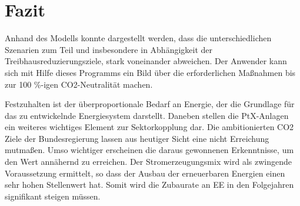 \section{Fazit}
Anhand des Modells konnte dargestellt werden, dass die unterschiedlichen Szenarien zum Teil und insbesondere in Abhängigkeit der Treibhausreduzierungsziele, stark voneinander abweichen. Der Anwender kann sich mit Hilfe dieses Programms ein Bild über die erforderlichen Maßnahmen bis zur 100 \%-igen CO2-Neutralität machen. 

Festzuhalten ist der überproportionale Bedarf an Energie, der die Grundlage für das zu entwickelnde Energiesystem darstellt. Daneben stellen die PtX-Anlagen ein weiteres wichtiges Element zur Sektorkopplung dar. 
\newline
Die ambitionierten CO2 Ziele der Bundesregierung lassen aus heutiger Sicht eine nicht Erreichung mutmaßen. Umso wichtiger erscheinen die daraus gewonnenen Erkenntnisse, um den Wert annähernd zu erreichen. Der Stromerzeugungsmix wird als zwingende Voraussetzung ermittelt, so dass der Ausbau der erneuerbaren Energien einen sehr hohen Stellenwert hat. Somit wird die Zubaurate an EE in den Folgejahren signifikant steigen müssen. 

